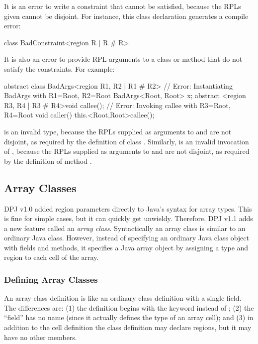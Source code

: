 It is an error to write a constraint that cannot be satisfied, because
the RPLs given cannot be disjoint.  For instance, this class
declaration generates a compile error:
%
\begin{dpjlisting}
class BadConstraint<region R | R # R> {}
\end{dpjlisting}

It is also an error to provide RPL arguments to a class or method that
do not satisfy the constraints.  For example:
%
\begin{dpjlisting}
abstract class BadArgs<region R1, R2 | R1 # R2> {
    // Error:  Instantiating BadArgs with R1=Root, R2=Root
    BadArgs<Root, Root> x;
    abstract <region R3, R4 | R3 # R4>void callee();
    // Error:  Invoking callee with R3=Root, R4=Root
    void caller() {
        this.<Root,Root>callee();
    }
}
\end{dpjlisting}
%
 is an invalid type, because the RPLs
supplied as arguments to  and  are not disjoint, as
required by the definition of class .  Similarly,
 is an invalid invocation of
, because the RPLs supplied as arguments to  and
 are not disjoint, as required by the definition of method
.

\subsection{Array Classes%
\label{sec:classes:array}}

DPJ v1.0 added region parameters directly to Java's syntax for array
types.  This is fine for simple cases, but it can quickly get
unwieldy.  Therefore, DPJ v1.1 adds a new feature called an
\emph{array class}.  Syntactically an array class is similar to an
ordinary Java class.  However, instead of specifying an ordinary Java
class object with fields and methods, it specifies a Java array object
by assigning a type and region to each cell of the array.

\subsubsection{Defining Array Classes}

An array class definition is like an ordinary class definition with a
single field.  The differences are: (1) the definition begins with the
keyword  instead of ; (2) the ``field'' has
no name (since it actually defines the type of an array cell); and (3)
in addition to the cell definition the class definition may declare
regions, but it may have no other members.


